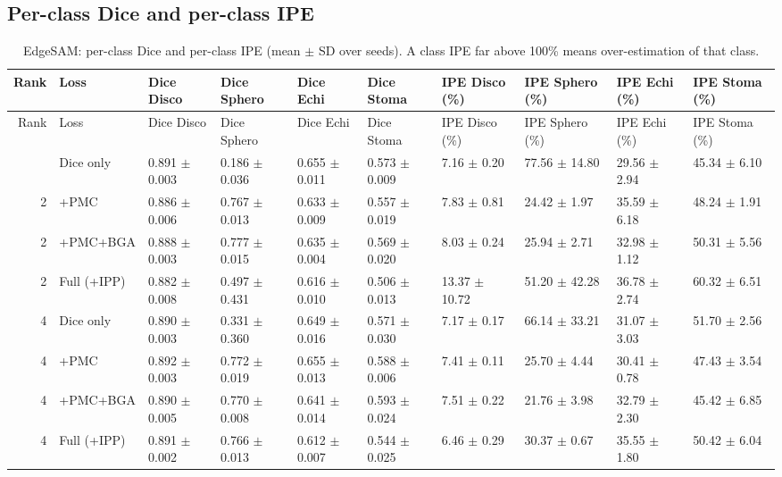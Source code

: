 \documentclass[10pt]{article}
\begin{document}
\begin{landscape}
\section{Per-class Dice and per-class IPE}
{\scriptsize
\begin{longtable}{r l l l l l l l l l}
\caption{EdgeSAM: per-class Dice and per-class IPE (mean $\pm$ SD over seeds). A class IPE far above 100\% means over-estimation of that class.}\label{tab:cls_edge_sam}\\
\toprule
Rank & Loss & Dice Disco & Dice Sphero & Dice Echi & Dice Stoma & IPE Disco (\%) & IPE Sphero (\%) & IPE Echi (\%) & IPE Stoma (\%) \\
\midrule
\endfirsthead
\toprule
Rank & Loss & Dice Disco & Dice Sphero & Dice Echi & Dice Stoma & IPE Disco (\%) & IPE Sphero (\%) & IPE Echi (\%) & IPE Stoma (\%) \\
\midrule
\endhead
\bottomrule
\endfoot
2 & Dice only & 0.891 $\pm$ 0.003 & 0.186 $\pm$ 0.036 & 0.655 $\pm$ 0.011 & 0.573 $\pm$ 0.009 & 7.16 $\pm$ 0.20 & 77.56 $\pm$ 14.80 & 29.56 $\pm$ 2.94 & 45.34 $\pm$ 6.10 \\
2 & +PMC & 0.886 $\pm$ 0.006 & 0.767 $\pm$ 0.013 & 0.633 $\pm$ 0.009 & 0.557 $\pm$ 0.019 & 7.83 $\pm$ 0.81 & 24.42 $\pm$ 1.97 & 35.59 $\pm$ 6.18 & 48.24 $\pm$ 1.91 \\
2 & +PMC+BGA & 0.888 $\pm$ 0.003 & 0.777 $\pm$ 0.015 & 0.635 $\pm$ 0.004 & 0.569 $\pm$ 0.020 & 8.03 $\pm$ 0.24 & 25.94 $\pm$ 2.71 & 32.98 $\pm$ 1.12 & 50.31 $\pm$ 5.56 \\
2 & Full (+IPP) & 0.882 $\pm$ 0.008 & 0.497 $\pm$ 0.431 & 0.616 $\pm$ 0.010 & 0.506 $\pm$ 0.013 & 13.37 $\pm$ 10.72 & 51.20 $\pm$ 42.28 & 36.78 $\pm$ 2.74 & 60.32 $\pm$ 6.51 \\
4 & Dice only & 0.890 $\pm$ 0.003 & 0.331 $\pm$ 0.360 & 0.649 $\pm$ 0.016 & 0.571 $\pm$ 0.030 & 7.17 $\pm$ 0.17 & 66.14 $\pm$ 33.21 & 31.07 $\pm$ 3.03 & 51.70 $\pm$ 2.56 \\
4 & +PMC & 0.892 $\pm$ 0.003 & 0.772 $\pm$ 0.019 & 0.655 $\pm$ 0.013 & 0.588 $\pm$ 0.006 & 7.41 $\pm$ 0.11 & 25.70 $\pm$ 4.44 & 30.41 $\pm$ 0.78 & 47.43 $\pm$ 3.54 \\
4 & +PMC+BGA & 0.890 $\pm$ 0.005 & 0.770 $\pm$ 0.008 & 0.641 $\pm$ 0.014 & 0.593 $\pm$ 0.024 & 7.51 $\pm$ 0.22 & 21.76 $\pm$ 3.98 & 32.79 $\pm$ 2.30 & 45.42 $\pm$ 6.85 \\
4 & Full (+IPP) & 0.891 $\pm$ 0.002 & 0.766 $\pm$ 0.013 & 0.612 $\pm$ 0.007 & 0.544 $\pm$ 0.025 & 6.46 $\pm$ 0.29 & 30.37 $\pm$ 0.67 & 35.55 $\pm$ 1.80 & 50.42 $\pm$ 6.04 \\

\end{longtable}}
\end{landscape}
\end{document}
